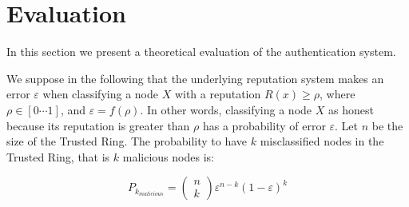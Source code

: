 
\chapter{Evaluation}

In this section we present a theoretical evaluation of
the authentication system.


We suppose in the following that the underlying
reputation system makes an error $\varepsilon$ when classifying a
node $X$ with a reputation $R(x) \geq \rho$, where $\rho \in [ 0 \cdots 1 ]$,
and $ \varepsilon = f ( \rho )$. In other words, classifying a node $X$ as
honest because its reputation is greater than $\rho$ has a
probability of error $\varepsilon$.
Let $n$ be the size of the Trusted Ring. The probability
to have $k$ misclassified nodes in the Trusted Ring, that
is $k$ malicious nodes is:

$$
P_{k_{malicious}} = \left(\!
                          \begin{array}{c}
                            n\\
                            k
                          \end{array}
                    \!\right)              
                    \varepsilon^{n-k} ( 1 - \varepsilon )^k
$$

